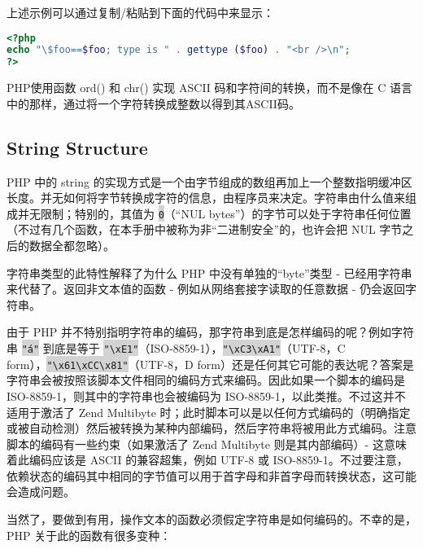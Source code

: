 上述示例可以通过复制/粘贴到下面的代码中来显示：

\begin{lstlisting}[language=PHP]
<?php
echo "\$foo==$foo; type is " . gettype ($foo) . "<br />\n";
?>
\end{lstlisting}

PHP使用函数 ord() 和 chr() 实现 ASCII 码和字符间的转换，而不是像在 C 语言中的那样，通过将一个字符转换成整数以得到其ASCII码。


\subsection{String Structure}

PHP 中的 string 的实现方式是一个由字节组成的数组再加上一个整数指明缓冲区长度。并无如何将字节转换成字符的信息，由程序员来决定。字符串由什么值来组成并无限制；特别的，其值为 \colorbox{lightgray}{\texttt{0}}（“NUL bytes”）的字节可以处于字符串任何位置（不过有几个函数，在本手册中被称为非“二进制安全”的，也许会把 NUL 字节之后的数据全都忽略）。

字符串类型的此特性解释了为什么 PHP 中没有单独的“byte”类型 - 已经用字符串来代替了。返回非文本值的函数 - 例如从网络套接字读取的任意数据 - 仍会返回字符串。

由于 PHP 并不特别指明字符串的编码，那字符串到底是怎样编码的呢？例如字符串 \colorbox{lightgray}{\texttt{"á"}} 到底是等于 \colorbox{lightgray}{\texttt{"\textbackslash xE1"}}（ISO-8859-1），\colorbox{lightgray}{\texttt{"\textbackslash xC3\textbackslash xA1"}}（UTF-8，C form），\colorbox{lightgray}{\texttt{"\textbackslash x61\textbackslash xCC\textbackslash x81"}}（UTF-8，D form）还是任何其它可能的表达呢？答案是字符串会被按照该脚本文件相同的编码方式来编码。因此如果一个脚本的编码是 ISO-8859-1，则其中的字符串也会被编码为 ISO-8859-1，以此类推。不过这并不适用于激活了 Zend Multibyte 时；此时脚本可以是以任何方式编码的（明确指定或被自动检测）然后被转换为某种内部编码，然后字符串将被用此方式编码。注意脚本的编码有一些约束（如果激活了 Zend Multibyte 则是其内部编码）- 这意味着此编码应该是 ASCII 的兼容超集，例如 UTF-8 或 ISO-8859-1。不过要注意，依赖状态的编码其中相同的字节值可以用于首字母和非首字母而转换状态，这可能会造成问题。

当然了，要做到有用，操作文本的函数必须假定字符串是如何编码的。不幸的是，PHP 关于此的函数有很多变种：


